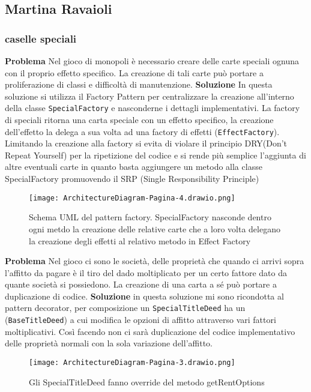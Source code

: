 \subsection{Martina Ravaioli}
\subsubsection{caselle speciali}

\textbf{Problema}\newline
Nel gioco di monopoli è necessario creare delle carte speciali ognuna con il proprio effetto specifico. La creazione di tali carte può portare a proliferazione di classi e difficoltà di manutenzione.\newline\newline
\textbf{Soluzione}\newline
In questa soluzione si utilizza il Factory Pattern per centralizzare la creazione all’interno della classe \texttt{SpecialFactory} e nasconderne i dettagli implementativi.
La factory di speciali ritorna una carta speciale con un effetto specifico, la creazione dell’effetto la delega a sua volta ad una factory di effetti (\texttt{EffectFactory}).
Limitando la creazione alla factory si evita di violare il principio DRY(Don’t Repeat Yourself) per la ripetizione del codice e si rende più semplice l’aggiunta di altre eventuali carte  in quanto basta aggiungere un metodo alla classe SpecialFactory promuovendo il SRP (Single Responsibility Principle)

\begin{figure}[h]
    \centering
    \texttt{[image: ArchitectureDiagram-Pagina-4.drawio.png]}
    \caption{Schema UML del pattern factory. SpecialFactory nasconde dentro ogni metdo la creazione delle relative carte che a loro volta delegano la creazione degli effetti al relativo metodo in Effect Factory}
    \label{img:ArchitectureDiagram-Pagina-4}
\end{figure}

\textbf{Problema}\newline
Nel gioco ci sono le società, delle proprietà che quando ci arrivi sopra l’affitto da pagare è il tiro del dado moltiplicato per un certo fattore dato da quante società si possiedono. 
La creazione di una carta a sé può portare a duplicazione di codice. 
\newline\newline
\textbf{Soluzione}\newline
in questa soluzione mi sono ricondotta al pattern decorator, per composizione un \texttt{SpecialTitleDeed} ha un (\texttt{BaseTitleDeed}) a cui modifica le opzioni di affitto attraverso vari fattori moltiplicativi.
Così facendo non ci sarà duplicazione del codice implementativo delle proprietà normali con la sola variazione dell'affitto.
\begin{figure}[h]
    \centering
    \texttt{[image: ArchitectureDiagram-Pagina-3.drawio.png]}
    \caption{Gli SpecialTitleDeed fanno override del metodo getRentOptions}
    \label{img:ArchitectureDiagram-Pagina-3}
\end{figure}

